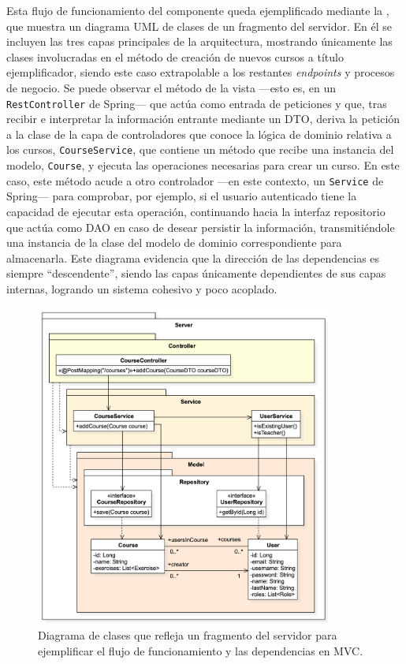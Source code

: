 Esta flujo de funcionamiento del componente queda ejemplificado mediante la , que muestra un diagrama UML de clases de un fragmento del servidor. En él se incluyen las tres capas principales de la arquitectura, mostrando únicamente las clases involucradas en el método de creación de nuevos cursos a título ejemplificador, siendo este caso extrapolable a los restantes \textit{endpoints} y procesos de negocio. Se puede observar el método de la vista ---esto es, en un \texttt{RestController} de Spring--- que actúa como entrada de peticiones y que, tras recibir e interpretar la información entrante mediante un DTO, deriva la petición a la clase de la capa de controladores que conoce la lógica de dominio relativa a los cursos, \texttt{CourseService}, que contiene un método que recibe una instancia del modelo, \texttt{Course}, y ejecuta las operaciones necesarias para crear un curso. En este caso, este método acude a otro controlador ---en este contexto, un \texttt{Service} de Spring--- para comprobar, por ejemplo, si el usuario autenticado tiene la capacidad de ejecutar esta operación, continuando hacia la interfaz repositorio que actúa como DAO en caso de desear persistir la información, transmitiéndole una instancia de la clase del modelo de dominio correspondiente para almacenarla. Este diagrama evidencia que la dirección de las dependencias es siempre ``descendente'', siendo las capas únicamente dependientes de sus capas internas, logrando un sistema cohesivo y poco acoplado.

\begin{figure}[ht]
    \centering
    \includegraphics[width=0.8725\textwidth]{imagenes/utilizadas/4-2-arquitectura/diagramas/diag3-mvcServidorEjemplo.png}
    \caption{Diagrama de clases que refleja un fragmento del servidor para ejemplificar el flujo de funcionamiento y las dependencias en MVC.}
    \label{fig:diagMVCServidorEjemplo}
\end{figure}

